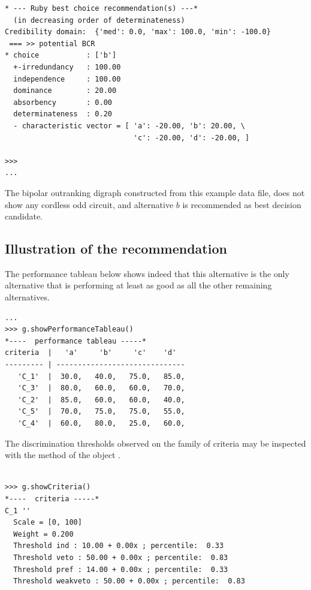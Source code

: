 \documentclass{article}
\newcommand{\+}{\verb+}
\renewcommand{\*}{\back{}}
\newcommand{\Ruby}{{\texorhtml{\sc{Rubis}}{\emph{Rubis}}}\xspace }
\begin{document}
\begin{center}
\begin{example}
\begin{verbatim}
* --- Ruby best choice recommendation(s) ---*
  (in decreasing order of determinateness)   
Credibility domain:  {'med': 0.0, 'max': 100.0, 'min': -100.0}
 === >> potential BCR 
* choice           : ['b']
  +-irredundancy   : 100.00
  independence     : 100.00
  dominance        : 20.00
  absorbency       : 0.00
  determinateness  : 0.20
  - characteristic vector = [ 'a': -20.00, 'b': 20.00, \
                              'c': -20.00, 'd': -20.00, ]

>>> 
...
\end{verbatim}
\end{example}

The bipolar outranking digraph constructed from this example data file, does not show any cordless odd circuit, and alternative $b$ is recommended as best decision candidate. 

\subsection{Illustration of the \Ruby recommendation}

The performance tableau below shows indeed that this alternative is the only alternative that is performing at least as good as all the other remaining alternatives.
\begin{example}
\begin{verbatim}
...
>>> g.showPerformanceTableau()
*----  performance tableau -----*
criteria  |   'a'     'b'     'c'    'd'   
--------- | ------------------------------
   'C_1'  |  30.0,   40.0,   75.0,   85.0, 
   'C_3'  |  80.0,   60.0,   60.0,   70.0, 
   'C_2'  |  85.0,   60.0,   60.0,   40.0, 
   'C_5'  |  70.0,   75.0,   75.0,   55.0, 
   'C_4'  |  60.0,   80.0,   25.0,   60.0, 
\end{verbatim}
\end{example}

The discrimination thresholds observed on the family of criteria may be inspected with the  method of the  object . 

\begin{example}
\begin{verbatim}

>>> g.showCriteria()
*----  criteria -----*
C_1 ''
  Scale = [0, 100]
  Weight = 0.200 
  Threshold ind : 10.00 + 0.00x ; percentile:  0.33
  Threshold veto : 50.00 + 0.00x ; percentile:  0.83
  Threshold pref : 14.00 + 0.00x ; percentile:  0.33
  Threshold weakveto : 50.00 + 0.00x ; percentile:  0.83


\end{verbatim}
\end{example}
\end{center}
\end{document}
